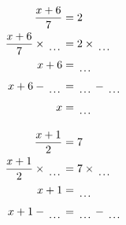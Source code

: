 \documentclass[12pt]{article}
\newcounter{minipagecount}
\begin{document}
\begin{multicols}{2}
\begin{minipage}[t]{0.45\textwidth}
    \raggedright %
    \begin{align*} %
        \frac{x + 6}{7} &= 2\\
        \frac{x + 6}{7} \times\dotuline{\hspace{5mm}} &= 2 \times\dotuline{\hspace{5mm}}\\
        x + 6 &= \dotuline{\hspace{5mm}}\\
        x + 6 - \dotuline{\hspace{5mm}} &= \dotuline{\hspace{5mm}} - \dotuline{\hspace{5mm}}\\
        x &= \dotuline{\hspace{5mm}}\\
    \end{align*}
\end{minipage}\columnbreak
\noindent{(\theminipagecount)}\hspace{0.1mm} %
\begin{minipage}[t]{0.45\textwidth} %
    \vspace{-26pt}  %
    \raggedright %
    \begin{align*} %
        \frac{x + 1}{2} &= 7\\
        \frac{x + 1}{2} \times\dotuline{\hspace{5mm}} &= 7 \times\dotuline{\hspace{5mm}}\\
        x + 1 &= \dotuline{\hspace{5mm}}\\
        x + 1 - \dotuline{\hspace{5mm}} &= \dotuline{\hspace{5mm}} - \dotuline{\hspace{5mm}}\\

\end{align*}
\end{minipage}
\end{multicols}
\end{document}
